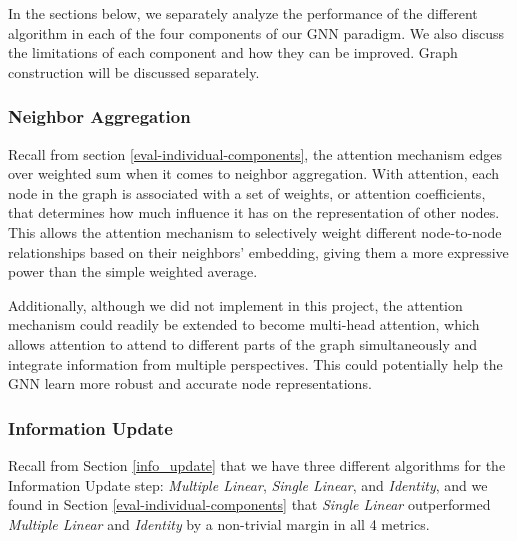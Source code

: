 \documentclass{article}
\begin{document}
In the sections below, we separately analyze the performance of the different algorithm in each of the four components of our GNN paradigm. We also discuss the limitations of each component and how they can be improved. Graph construction will be discussed separately.

\subsubsection{Neighbor Aggregation}

Recall from section \ref{eval-individual-components}, the attention mechanism edges over weighted sum when it comes to neighbor aggregation. With attention, each node in the graph is associated with a set of weights, or attention coefficients, that determines how much influence it has on the representation of other nodes. This allows the attention mechanism to selectively weight different node-to-node relationships based on their neighbors' embedding, giving them a more expressive power than the simple weighted average.

Additionally, although we did not implement in this project, the attention mechanism could readily be extended to become multi-head attention, which allows attention to attend to different parts of the graph simultaneously and integrate information from multiple perspectives. This could potentially help the GNN learn more robust and accurate node representations.

\subsubsection{Information Update}

Recall from Section \ref{info_update} that we have three different algorithms for the Information Update step: \textit{Multiple Linear}, \textit{Single Linear}, and \textit{Identity}, and we found in Section \ref{eval-individual-components} that \textit{Single Linear} outperformed \textit{Multiple Linear} and \textit{Identity} by a non-trivial margin in all 4 metrics.

\end{document}

